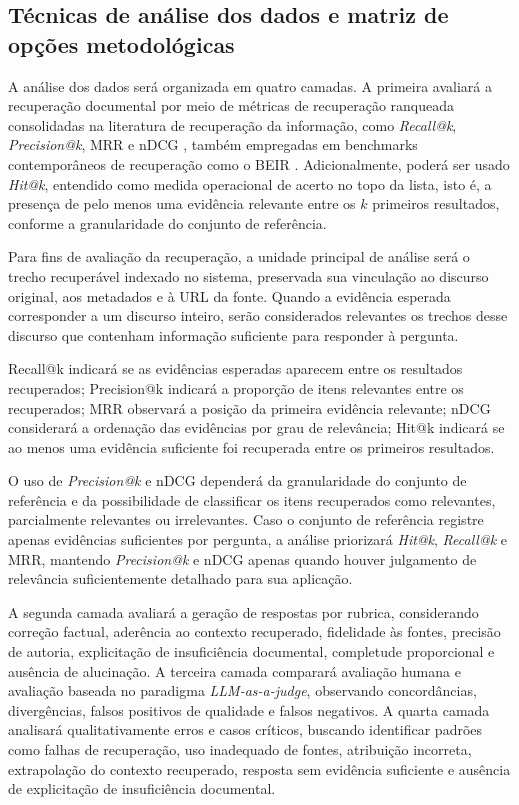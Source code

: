 \subsection{Técnicas de análise dos dados e matriz de opções metodológicas}

A análise dos dados será organizada em quatro camadas. A primeira avaliará a recuperação documental por meio de métricas de recuperação ranqueada consolidadas na literatura de recuperação da informação, como \textit{Recall@k}, \textit{Precision@k}, MRR e nDCG \parencite{manningEtAl2008informationRetrieval}, também empregadas em benchmarks contemporâneos de recuperação como o BEIR \parencite{thakurEtAl2021beir}. Adicionalmente, poderá ser usado \textit{Hit@k}, entendido como medida operacional de acerto no topo da lista, isto é, a presença de pelo menos uma evidência relevante entre os \(k\) primeiros resultados, conforme a granularidade do conjunto de referência.


Para fins de avaliação da recuperação, a unidade principal de análise será o trecho recuperável indexado no sistema, preservada sua vinculação ao discurso original, aos metadados e à URL da fonte. Quando a evidência esperada corresponder a um discurso inteiro, serão considerados relevantes os trechos desse discurso que contenham informação suficiente para responder à pergunta.

Recall@k indicará se as evidências esperadas aparecem entre os resultados recuperados; Precision@k indicará a proporção de itens relevantes entre os recuperados; MRR observará a posição da primeira evidência relevante; nDCG considerará a ordenação das evidências por grau de relevância; Hit@k indicará se ao menos uma evidência suficiente foi recuperada entre os primeiros resultados.

O uso de \textit{Precision@k} e nDCG dependerá da granularidade do conjunto de referência e da possibilidade de classificar os itens recuperados como relevantes, parcialmente relevantes ou irrelevantes. Caso o conjunto de referência registre apenas evidências suficientes por pergunta, a análise priorizará \textit{Hit@k}, \textit{Recall@k} e MRR, mantendo \textit{Precision@k} e nDCG apenas quando houver julgamento de relevância suficientemente detalhado para sua aplicação.

A segunda camada avaliará a geração de respostas por rubrica, considerando correção factual, aderência ao contexto recuperado, fidelidade às fontes, precisão de autoria, explicitação de insuficiência documental, completude proporcional e ausência de alucinação. A terceira camada comparará avaliação humana e avaliação baseada no paradigma \textit{LLM-as-a-judge}, observando concordâncias, divergências, falsos positivos de qualidade e falsos negativos. A quarta camada analisará qualitativamente erros e casos críticos, buscando identificar padrões como falhas de recuperação, uso inadequado de fontes, atribuição incorreta, extrapolação do contexto recuperado, resposta sem evidência suficiente e ausência de explicitação de insuficiência documental.

